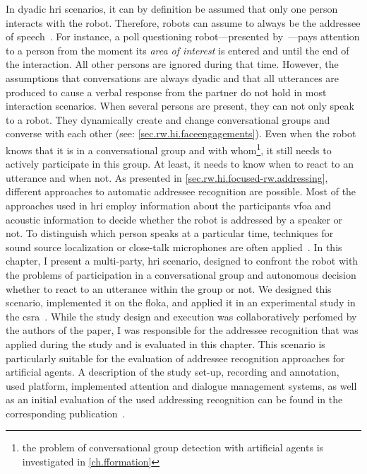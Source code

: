 In dyadic \gls{hri} scenarios, it can by definition be assumed that only one person interacts with the \gls{robot}.
Therefore, \glspl{robot} can assume to always be the \gls{addressee} of speech~\cite{Holthaus,Carlmeyer2014,Huang2016}.
For instance, a poll questioning \gls{robot}---presented by~---pays attention to a person from the moment its \emph{area of interest} is entered and until the end of the interaction.
All other persons are ignored during that time.
However, the assumptions that \glspl{conversation} are always dyadic and that all utterances are produced to cause a verbal response from the  partner do not hold in most interaction scenarios.
When several persons are present, they can not only speak to a \gls{robot}.
They dynamically create and change \glspl{conversational group} and converse with each other (see: \cref{sec.rw.hi.faceengagements}).
Even when the \gls{robot} knows that it is in a \gls{conversational group} and with whom\footnote{the problem of {conversational group} detection with \glspl{artificial agent} is investigated in \cref{ch.fformation}}, it still needs to actively participate in this group.
At least, it needs to know when to react to an utterance and when not.
As presented in \cref{sec.rw.hi.focused-rw.addressing}, different approaches to automatic \gls{addressee} recognition are possible.
Most of the approaches used in \gls{hri} employ information about the participants \gls{vfoa} and acoustic information to decide whether the \gls{robot} is addressed by a \gls{speaker} or not.
To distinguish which person speaks at a particular time, techniques for sound source localization or close-talk microphones are often applied~\cite{Lang2003,Skantze2014}.
In this chapter, I present a multi-party, \acrlong{hri} scenario, designed to confront the \gls{robot} with the problems of participation in a \gls{conversational group} and autonomous decision whether to react to an utterance within the group or not.
We designed this scenario, implemented it on the \gls{floka}, and applied it in an experimental study in the \gls{csra}~\cite{Richter}.
While the study design and execution was collaboratively perfomed by the authors of the paper, I was responsible for the addressee recognition that was applied during the study and is evaluated in this chapter.
This scenario is particularly suitable for the evaluation of \gls{addressee} recognition approaches for \glspl{artificial agent}.
A description of the study set-up, recording and annotation, used platform, implemented attention and dialogue management systems, as well as an initial evaluation of the used addressing recognition can be found in the corresponding publication~\cite{Richter}.
